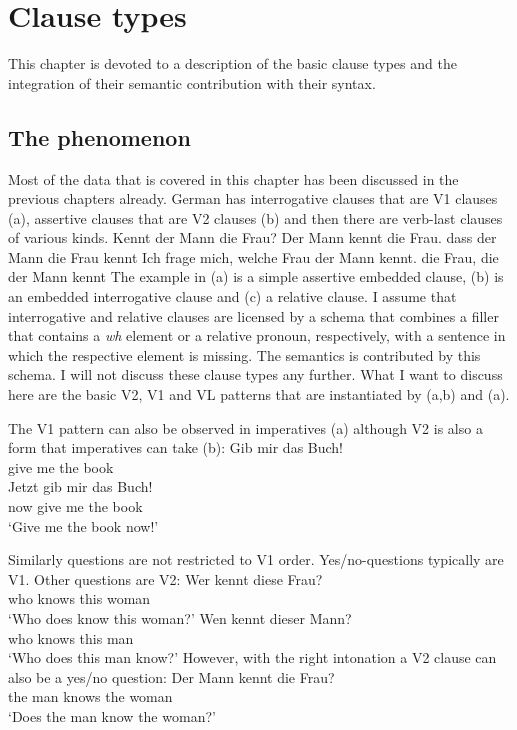 
\chapter{Clause types}

This chapter is devoted to a description of the basic clause types and the integration of their
semantic contribution with their syntax.


\section{The phenomenon}
\label{sec-phenomenon-clause-types}

Most of the data that is covered in this chapter has been discussed in the previous chapters
already. German has interrogative clauses that are V1 clauses (a), assertive clauses that are
V2 clauses (b) and then there are verb-last clauses of various kinds.
\eal
\ex Kennt der Mann die Frau?
\ex Der Mann kennt die Frau.
\zl
\eal
\ex dass der Mann die Frau kennt
\ex Ich frage mich, welche Frau der Mann kennt.
\ex die Frau, die der Mann kennt
\zl
The example in (a) is a simple assertive embedded clause, (b) is an embedded
interrogative clause and (c) a relative clause. I assume that interrogative and relative
clauses are licensed by a schema that combines a filler that contains a \emph{wh} element or a
relative pronoun, respectively, with a sentence in which the respective element is missing. The
semantics is contributed by this schema. I will not discuss these clause types any further. What I
want to discuss here are the basic V2, V1 and VL patterns that are instantiated by (a,b) and
(a).

The V1 pattern can also be observed in imperatives (a) although V2 is also a form that
imperatives can take (b):
\eal
\ex
\gll Gib mir das Buch!\\
     give me the book\\
\ex
\gll Jetzt gib mir das Buch!\\
     now   give me the book\\
\glt `Give me the book now!'         
\zl

Similarly questions are not restricted to V1 order. Yes/no-questions typically are V1. Other
questions are V2:
\eal
\ex 
\gll Wer kennt diese Frau?\\
     who knows this woman\\
\glt `Who does know this woman?'
\ex 
\gll Wen kennt dieser Mann?\\
     who knows this man\\
\glt `Who does this man know?'
\zl
However, with the right intonation a V2 clause can also be a yes/no question:
\ea
\gll Der Mann kennt die Frau?\\
     the man  knows the woman\\
\glt `Does the man know the woman?'
\z

